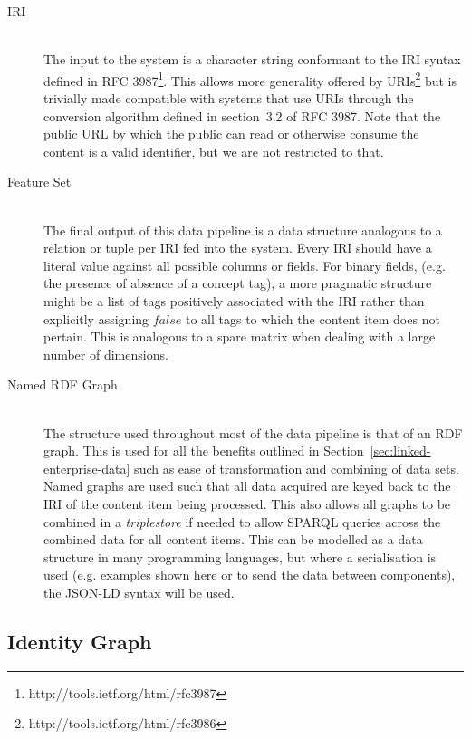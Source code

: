 \begin{description}

\item[IRI] \hfill \\
The input to the system is a character string conformant to the
IRI syntax defined in RFC 3987\footnote{http://tools.ietf.org/html/rfc3987}.
This allows more generality offered by
URIs\footnote{http://tools.ietf.org/html/rfc3986} but is trivially made
compatible with systems that use URIs through the conversion algorithm defined
in section~3.2 of RFC 3987. Note that the public URL by which the public can
read or otherwise consume the content is a valid identifier, but we are not
restricted to that.

\item[Feature Set] \hfill \\
The final output of this data pipeline is a data structure
analogous to a relation or tuple per IRI fed into the system. Every IRI should
have a literal value against all possible columns or fields. For binary fields,
(e.g. the presence of absence of a concept tag), a more pragmatic structure
might be a list of tags positively associated with the IRI rather than
explicitly assigning $false$ to all tags to which the content item does not
pertain. This is analogous to a spare matrix when dealing with a large number
of dimensions.

\item[Named RDF Graph] \hfill \\
The structure used throughout most of the data pipeline
is that of an RDF graph. This is used for all the benefits outlined in
Section~\ref{sec:linked-enterprise-data} such as ease of transformation and
combining of data sets. Named graphs are used such that all data acquired
are keyed back to the IRI of the content item being processed. This also allows
all graphs to be combined in a \emph{triplestore} if needed to allow SPARQL
queries across the combined data for all content items. This can be modelled as
a data structure in many programming languages, but where a serialisation is
used (e.g. examples shown here or to send the data between components), the
JSON-LD\cite{sporny2014json} syntax will be used.
\end{description}

\subsection{Identity Graph}
\label{sec:identity-graph}

